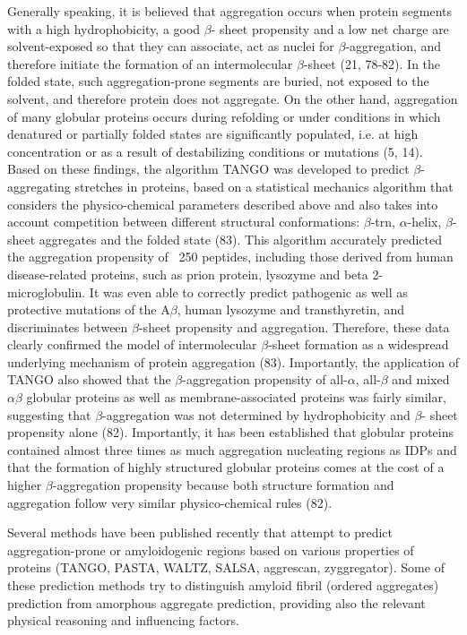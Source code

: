 Generally speaking, it is believed that aggregation occurs when protein segments with a high hydrophobicity, a good $\beta$-
sheet propensity and a low net charge are solvent-exposed so that they can associate, act as nuclei for $\beta$-aggregation, and
therefore initiate the formation of an intermolecular $\beta$-sheet (21, 78-82). In the folded state, such aggregation-prone segments are
buried, not exposed to the solvent, and therefore protein does not aggregate. On the other hand, aggregation of many globular
proteins occurs during refolding or under conditions in which denatured or partially folded states are significantly populated, i.e.
at high concentration or as a result of destabilizing conditions or mutations (5, 14). Based on these findings, the algorithm
TANGO was developed to predict $\beta$-aggregating stretches in proteins, based on a statistical mechanics algorithm that considers
the physico-chemical parameters described above and also takes into account competition between different structural
conformations: $\beta$-trn, $\alpha$-helix, $\beta$-sheet aggregates and the folded state (83). This algorithm accurately predicted the aggregation
propensity of ~250 peptides, including those derived from human disease-related proteins, such as prion protein, lysozyme and
beta 2-microglobulin. It was even able to correctly predict pathogenic as well as protective mutations of the A$\beta$, human lysozyme
and transthyretin, and discriminates between $\beta$-sheet propensity and aggregation. Therefore, these data clearly confirmed the
model of intermolecular $\beta$-sheet formation as a widespread underlying mechanism of protein aggregation (83). Importantly, the
application of TANGO also showed that the $\beta$-aggregation propensity of all-$\alpha$, all-$\beta$ and mixed $\alpha\beta$ globular proteins as well as
membrane-associated proteins was fairly similar, suggesting that $\beta$-aggregation was not determined by hydrophobicity and $\beta$-
sheet propensity alone (82). Importantly, it has been established that globular proteins contained almost three times as much
aggregation nucleating regions as IDPs and that the formation of highly structured globular proteins comes at the cost of a higher
$\beta$-aggregation propensity because both structure formation and aggregation follow very similar physico-chemical rules (82).







Several methods have been published recently that attempt to predict aggregation-prone or amyloidogenic regions based on various properties of proteins (TANGO, PASTA, WALTZ, SALSA, aggrescan, zyggregator).
Some of these prediction methods try to distinguish amyloid fibril
(ordered aggregates) prediction from amorphous aggregate prediction, providing also the relevant physical reasoning and influencing factors.

